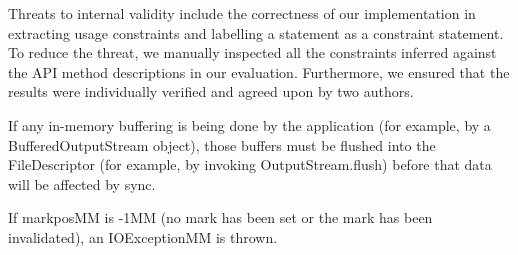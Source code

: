 Threats to internal validity include the correctness of our implementation in extracting usage constraints and labelling a statement as a constraint statement. To reduce the threat, we manually inspected all the constraints inferred against the API method descriptions in our evaluation. Furthermore, we ensured that the results were individually verified and agreed
upon by two authors.




If any in-memory buffering is being done by the application (for example, by a BufferedOutputStream object), those buffers must be flushed into the FileDescriptor (for example, by invoking OutputStream.flush) before that data will be affected by sync.


If markposMM is -1MM (no mark has been set or the mark has been invalidated), an IOExceptionMM is thrown.
